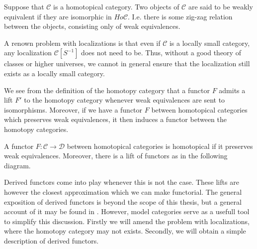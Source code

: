 \documentclass[../thesis.tex]{subfiles}
\begin{document}
            \begin{definition}
                Suppose that $\mathcal{C}$ is a homotopical category. Two objects of $\mathcal{C}$ are said to be weakly equivalent if they are isomorphic in $Ho\mathcal{C}$. I.e. there is some zig-zag relation between the objects, consisting only of weak equivalences.
            \end{definition}

            \begin{remark}
                A renown problem with localizations is that even if $\mathcal{C}$ is a locally small category, any localization $\mathcal{C}[S^{-1}]$ does not need to be. Thus, without a good theory of classes or higher universes, we cannot in general ensure that the localization still exists as a locally small category.
            \end{remark}

            We see from the definition of the homotopy category that a functor $F$ admits a lift $F'$ to the homotopy category whenever weak equivalences are sent to isomorphisms. Moreover, if we have a functor $F$ between homotopical categories which preserves weak equivalences, it then induces a functor between the homotopy categories.
            
            \begin{definition}
                A functor $F:\mathcal{C}\rightarrow \mathcal{D}$ between homotopical categories is homotopical if it preserves weak equivalences. Moreover, there is a lift of functors as in the following diagram.

                \begin{center}
                \end{center}
            \end{definition}

            Derived functors come into play whenever this is not the case. These lifts are however the closest approximation which we can make functorial. The general exposition of derived functors is beyond the scope of this thesis, but a general account of it may be found in . However, model categories serve as a usefull tool to simplify this discussion. Firstly we will amend the problem with localizations, where the homotopy category may not exists. Secondly, we will obtain a simple description of derived functors.
\end{document}
